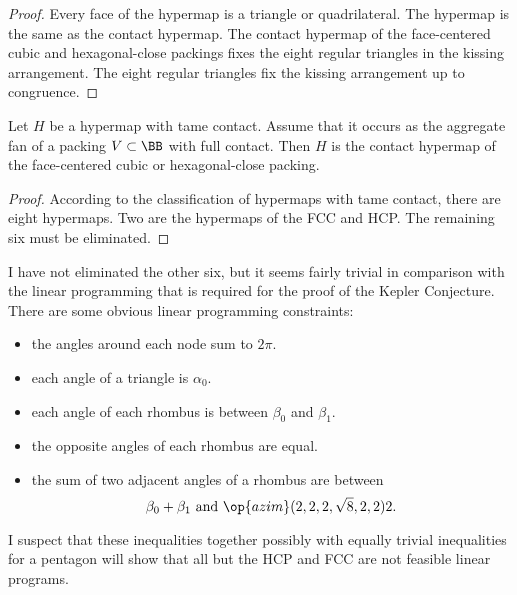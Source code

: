\begin{proof} Every face of the hypermap is a triangle or
  quadrilateral.  The hypermap is the same as the contact hypermap.
  The contact hypermap of the face-centered cubic and hexagonal-close
  packings fixes the eight regular triangles in the kissing
  arrangement.  The eight regular triangles fix the kissing
  arrangement up to congruence.
\end{proof}

\begin{lemma}[]\label{lemma:fcc-ft} Let $H$ be a hypermap
  with tame contact.  Assume that it occurs as the aggregate fan of a
   packing $V\subset\BB$  with full contact.  Then $H$ is the contact
  hypermap of the face-centered cubic or hexagonal-close packing.
\end{lemma}

\begin{proof} According to the classification of hypermaps with tame
  contact, there are eight hypermaps.  Two are the hypermaps of the
  FCC and HCP.  The remaining six must be eliminated.
\end{proof}

\begin{note}%
  I have not eliminated the other six, but it seems fairly trivial in
  comparison with the linear programming that is required for the
  proof of the Kepler Conjecture.  There are some obvious linear
  programming constraints:
\begin{itemize}
\item the angles around each node sum to $2\pi$.
\item each angle of a triangle is $\alpha_0$.
\item each angle of each rhombus is between $\beta_0$ and $\beta_1$.
\item the opposite angles of each rhombus are equal.
\item the sum of two adjacent angles of a rhombus are between
\begin{displaymath}
\beta_0 + \beta_1 \hbox{ and } \op{azim}(2,2,2,\sqrt8,2,2)2.
\end{displaymath}
\end{itemize}
I suspect that these inequalities together possibly with equally
trivial inequalities for a pentagon will show that all but the HCP and
FCC are not feasible linear programs.
\end{note}


